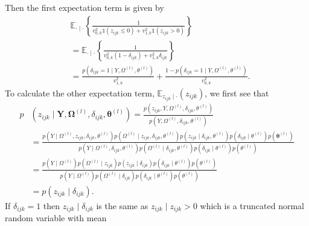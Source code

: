 \documentclass[a4paper, 11pt, oneside]{report}
\newcommand{\E}{\mathbb{E}}
\newcommand{\1}{\mathds{1}}
\newcommand{\powl}{^{(l)}}
\newcommand{\bOmega}{\mathbf{\Omega}}
\newcommand{\btheta}{\mathbf{\theta}}
\newcommand{\bY}{\mathbf{Y}}
\begin{document}
Then the first expectation term is given by
\begin{align*}
   & \E_{\cdot \mid \cdot} \left\{ \frac{1}{v_{0,k}^2 \1(z_{ijk} \leq 0) + v_{1,k}^2 \1(z_{ijk} > 0)} \right\} \\
   & = \E_{\cdot \mid \cdot} \left\{ \frac{1}{v_{0,k}^2 ( 1 - \delta_{ijk}) + v_{1,k}^2 \delta_{ijk}} \right\} \\
   & = \frac{p\left(\delta_{ijk} = 1 \mid Y, \Omega\powl, \theta\powl\right)}{v_{1,k}^2}
	+ \frac{1 - p\left(\delta_{ijk} = 1 \mid Y, \Omega\powl,
  \theta\powl\right)}{v_{0,k}^2}.
\end{align*}
To calculate the other expectation term, $\E_{z_{ijk} \mid \cdot}(z_{ijk})$, we
first see that
\begin{align*}
  p&\left(z_{ijk} \mid \bY, \bOmega\powl, \delta_{ijk}, \btheta\powl\right) =
	\frac{p\left(z_{ijk}, Y, \Omega\powl, \delta_{ijk}, \theta\powl\right)}{p\left(Y, \Omega\powl, \delta_{ijk}, \theta\powl\right)}                                                                                                                                                                                                                                                                                    \\
	               & = \frac{p\left(Y \mid \Omega\powl, z_{ijk}, \delta_{ijk}, \theta\powl\right) p\left(\Omega\powl \mid z_{ijk}, \delta_{ijk}, \theta\powl\right) p\left(z_{ijk} \mid \delta_{ijk}, \theta\powl\right) p\left(\delta_{ijk} \mid \theta\powl\right) p\left(\btheta\powl\right)}{p\left(Y \mid \Omega\powl, \delta_{ijk}, \theta\powl\right) p\left(\Omega\powl \mid \delta_{ijk}, \theta\powl\right) p\left(\delta_{ijk} \mid \theta\powl\right) p\left(\theta\powl\right)} \\
	               & = \frac{p\left(Y \mid \Omega\powl\right) p\left(\Omega\powl \mid z_{ijk}\right) p\left(z_{ijk} \mid \delta_{ijk}\right) p\left(\delta_{ijk} \mid \theta\powl\right) p\left(\theta\powl\right)}{p\left(Y \mid \Omega\powl\right) p\left(\Omega\powl \mid \delta_{ijk}\right) p\left(\delta_{ijk} \mid \theta\powl\right) p\left(\theta\powl\right)}                                                                                                                          \\
	               & = p(z_{ijk} \mid \delta_{ijk}).
\end{align*}
If $\delta_{ijk} = 1$ then $z_{ijk} \mid \delta_{ijk}$ is the same as $z_{ijk}
	\mid z_{ijk} > 0$ which is a truncated normal random variable with mean
\end{document}
